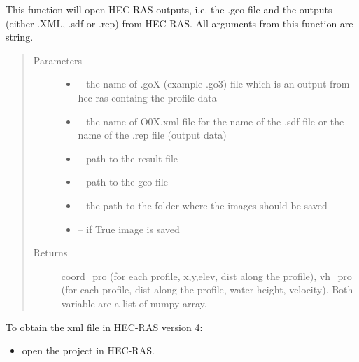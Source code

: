 \documentclass[letterpaper,10pt,english]{sphinxmanual}
\begin{document}
\begin{fulllineitems}
\label{\detokenize{index:src.Hec_ras06.open_hecras}}
This function will open HEC-RAS outputs, i.e. the .geo file and the outputs (either .XML, .sdf or .rep) from HEC-RAS.
All arguments from this function are string.
\begin{quote}\begin{description}
\item[{Parameters}] \leavevmode\begin{itemize}
\item {} 
 -- the name of .goX (example .go3) file which is an output from hec-ras containg the profile data

\item {} 
 -- the name of O0X.xml file for the name of the .sdf file  or the name of the .rep file (output data)

\item {} 
 -- path to the result file

\item {} 
 -- path to the geo file

\item {} 
 -- the path to the folder where the images should be saved

\item {} 
 -- if True image is saved

\end{itemize}

\item[{Returns}] \leavevmode
coord\_pro (for each profile, x,y,elev, dist along the profile), vh\_pro
(for each profile, dist along the profile, water height, velocity). Both variable are a list of numpy array.

\end{description}\end{quote}


To obtain the xml file in HEC-RAS version 4:
\begin{itemize}
\item {} 
open the project in HEC-RAS.


\end{itemize}
\end{fulllineitems}
\end{document}
